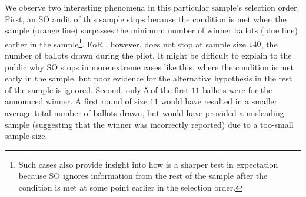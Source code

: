 We observe two interesting phenomena in this particular sample's selection order. 
First, an SO \BRAVO audit of this sample stops because the \BRAVO condition is met when the sample (orange line) surpasses the minimum number of winner ballots (blue line) earlier in the sample\footnote{Such cases also provide insight into how \Providence is a sharper test in expectation because SO \BRAVO ignores information from the rest of the sample after the \BRAVO condition is met at some point earlier in the selection order.}. EoR \BRAVO, however, does not stop at sample size $140$, the number of ballots drawn during the pilot. It might be difficult to explain to the public why SO \BRAVO stops in more extreme cases like this, where the condition is met early in the sample, but poor evidence for the alternative hypothesis in the rest of the sample is ignored. Second, only $5$ of the first $11$ ballots were for the announced winner. A first round of size $11$ would have resulted in a smaller average total number of ballots drawn, but would have provided a misleading sample (suggesting that the winner was incorrectly reported) due to a too-small sample size. 


